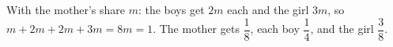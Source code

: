 With the mother's share $m$: the boys get $2m$ each and the girl $3m$, so $m+2m+2m+3m=8m=1$. The mother gets $\boxed{\dfrac18}$, each boy $\boxed{\dfrac14}$, and the girl $\boxed{\dfrac38}$.
